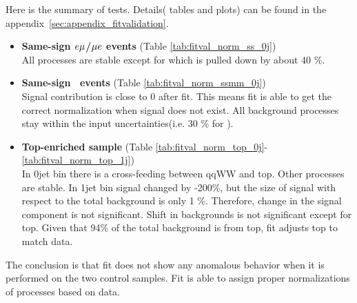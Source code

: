 Here is the summary of tests. Details( tables and plots) can be found in the 
appendix~\ref{sec:appendix_fitvalidation}. 
\begin{itemize}
    \item{\textbf{Same-sign $e\mu$/$\mu e$ events} (Table \ref{tab:fitval_norm_ss_0j}) \\ }  
        All processes are stable except for \Wgstar which is pulled down by about 40 \%.  
    \item{\textbf{Same-sign \M\M~events} (Table \ref{tab:fitval_norm_ssmm_0j}) \\ }  
        Signal contribution is close to 0 after fit. This means fit is able to 
        get the correct normalization when signal does not exist. All background 
        processes stay within the input uncertainties(i.e. 30 \% for  \Wgstar ).   
    \item{\textbf{Top-enriched sample} (Table \ref{tab:fitval_norm_top_0j}-\ref{tab:fitval_norm_top_1j}) \\ }  
        In 0jet bin there is a cross-feeding between qqWW and top. Other processes are stable. 
        In 1jet bin signal changed by -200\%, but the size of signal with respect to the total background 
        is only 1 \%. Therefore, change in the signal component is not significant. 
        Shift in backgrounds is not significant except for top. 
        Given that 94\% of the total background is from top, fit adjusts top to match data.  
\end{itemize} 

The conclusion is that fit does not show any anomalous behavior
when it is performed on the two control samples. Fit is able to assign 
proper normalizations of processes based on data.   

